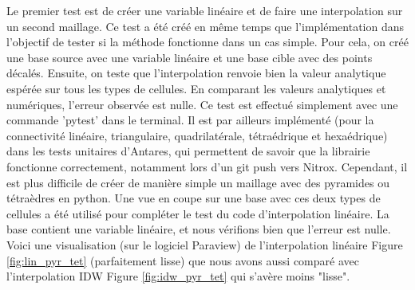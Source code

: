Le premier test est de créer une variable linéaire et de faire une interpolation sur un second maillage. Ce test a été créé en même temps que l'implémentation dans l'objectif de tester si la méthode fonctionne dans un cas simple. Pour cela, on créé une base source avec une variable linéaire et une base cible avec des points décalés. Ensuite, on teste que l'interpolation renvoie bien la valeur analytique espérée sur tous les types de cellules. En comparant les valeurs analytiques et numériques, l'erreur observée est nulle. Ce test est effectué simplement avec une commande 'pytest' dans le terminal. Il est par ailleurs implémenté (pour la connectivité linéaire, triangulaire, quadrilatérale, tétraédrique et hexaédrique) dans les tests unitaires d'Antares, qui permettent de savoir que la librairie fonctionne correctement, notamment lors d'un git push vers Nitrox. Cependant, il est plus difficile de créer de manière simple un maillage avec des pyramides ou tétraèdres en python.
Une vue en coupe sur une base avec ces deux types de cellules a été utilisé pour compléter le test du code d'interpolation linéaire. La base contient une variable linéaire, et nous vérifions bien que l'erreur est nulle. Voici une visualisation (sur le logiciel Paraview) de l'interpolation linéaire Figure \ref{fig:lin_pyr_tet} (parfaitement lisse) que nous avons aussi comparé avec l'interpolation IDW Figure \ref{fig:idw_pyr_tet} qui s'avère moins "lisse".
